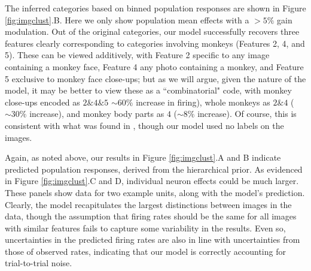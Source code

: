 \documentclass[10pt,letterpaper]{article}
\begin{document}
The inferred categories based on binned population responses are shown in Figure \ref{fig:imgclust}.B. Here we only show population mean effects with a $>5\%$ gain modulation. Out of the original categories, our model successfully recovers three features clearly corresponding to categories involving monkeys (Features 2, 4, and 5). These can be viewed additively, with Feature 2 specific to any image containing a monkey face, Feature 4 any photo containing a monkey, and Feature 5 exclusive to monkey face close-ups; but as we will argue, given the nature of the model, it may be better to view these as a ``combinatorial" code, with monkey close-ups encoded as $2\& 4\& 5$ $\sim 60\%$ increase in firing), whole monkeys as $2\& 4$ ($\sim 30\%$ increase), and monkey body parts as $4$ ($\sim 8\%$ increase). Of course, this is consistent with what was found in \cite{McMahon2014-qq}, though our model used no labels on the images.

Again, as noted above, our results in Figure \ref{fig:imgclust}.A and B indicate predicted population responses, derived from the hierarchical prior. As evidenced in Figure \ref{fig:imgclust}.C and D, individual neuron effects could be much larger. These panels show data for two example units, along with the model's prediction. Clearly, the model recapitulates the largest distinctions between images in the data, though the assumption that firing rates should be the same for all images with similar features fails to capture some variability in the results. Even so, uncertainties in the predicted firing rates are also in line with uncertainties from those of observed rates, indicating that our model is correctly accounting for trial-to-trial noise.
\end{document}
